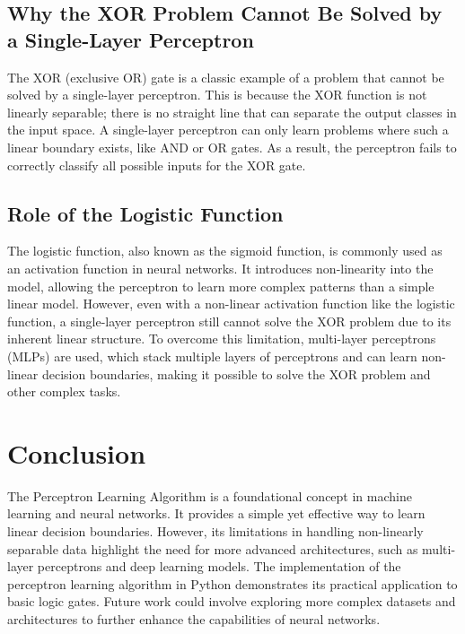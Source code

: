 \documentclass[a4paper, journal]{IEEEtran}
\begin{document}
\subsection{Why the XOR Problem Cannot Be Solved by a Single-Layer Perceptron}
The XOR (exclusive OR) gate is a classic example of a problem that cannot be solved by a single-layer perceptron. This is because the XOR function is not linearly separable; there is no straight line that can separate the output classes in the input space. A single-layer perceptron can only learn problems where such a linear boundary exists, like AND or OR gates. As a result, the perceptron fails to correctly classify all possible inputs for the XOR gate.

\subsection{Role of the Logistic Function}
The logistic function, also known as the sigmoid function, is commonly used as an activation function in neural networks. It introduces non-linearity into the model, allowing the perceptron to learn more complex patterns than a simple linear model. However, even with a non-linear activation function like the logistic function, a single-layer perceptron still cannot solve the XOR problem due to its inherent linear structure. To overcome this limitation, multi-layer perceptrons (MLPs) are used, which stack multiple layers of perceptrons and can learn non-linear decision boundaries, making it possible to solve the XOR problem and other complex tasks.

\section{Conclusion}
The Perceptron Learning Algorithm is a foundational concept in machine learning and neural networks. It provides a simple yet effective way to learn linear decision boundaries. However, its limitations in handling non-linearly separable data highlight the need for more advanced architectures, such as multi-layer perceptrons and deep learning models.
The implementation of the perceptron learning algorithm in Python demonstrates its practical application to basic logic gates. Future work could involve exploring more complex datasets and architectures to further enhance the capabilities of neural networks.




\end{document}
